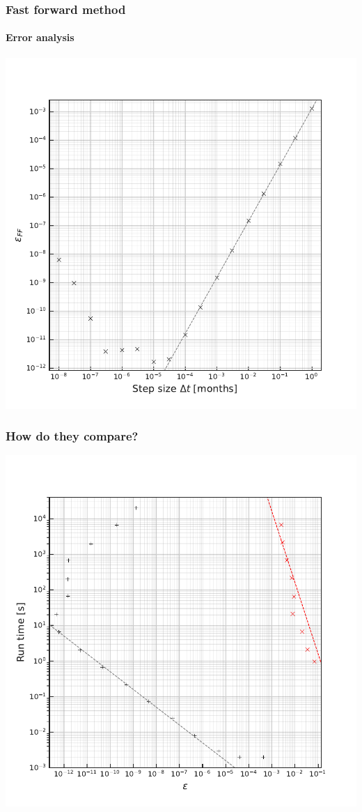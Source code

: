 \documentclass{beamer}
\begin{document}
\begin{frame}
    \frametitle{Fast forward method}
    \framesubtitle{Error analysis}
    \begin{center}
        \includegraphics[height=0.9\textheight]{figures/Global_error_ffwdmethod_max}
    \end{center}
\end{frame}

\begin{frame}
    \frametitle{How do they compare?}
    \begin{center}
        \includegraphics[height=0.9\textheight]{figures/Error_vs_runtime}
    \end{center}
\end{frame}
\end{document}
